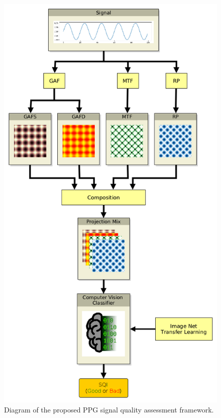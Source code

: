 \begin{figure}[!h]
	\centering
	\includegraphics[height=0.8\textheight]{img/method.png}
	\caption{Diagram of the proposed \acrlong{PPG} signal quality assessment framework.}
	\label{fig:method}
\end{figure}
